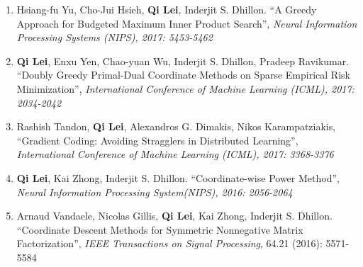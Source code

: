 \documentclass[margin, 10pt]{res} %
\begin{document}
\begin{resume}
\begin{enumerate}
\item{Hsiang-fu Yu, Cho-Jui Hsieh, \textbf{Qi Lei}, Inderjit S. Dhillon. 
      ``A Greedy Approach for Budgeted Maximum 
      Inner Product Search'', \textit{Neural Information Processing Systems 
      (NIPS), 2017: 5453-5462}}
    \item{\textbf{Qi Lei}, Enxu Yen, Chao-yuan Wu, Inderjit S. Dhillon, Pradeep 
        Ravikumar. ``Doubly Greedy Primal-Dual Coordinate Methods on Sparse Empirical 
  Risk Minimization'', \textit{International Conference of Machine 
    Learning (ICML), 2017: 2034-2042}}
\item{Rashish Tandon, \textbf{Qi Lei}, 
    Alexandros G. Dimakis, Nikos Karampatziakis, ``Gradient Coding: Avoiding 
    Stragglers in Distributed Learning'', \textit{International Conference of 
  Machine Learning (ICML), 2017: 3368-3376}}
  \item {\textbf{Qi Lei},
      Kai Zhong, Inderjit S. Dhillon. ``Coordinate-wise Power Method'', 
  \textit{Neural Information Processing System(NIPS), 2016: 2056-2064}}		

	\item {Arnaud Vandaele, Nicolas Gillis, \textbf{Qi Lei},
      Kai Zhong, Inderjit S. Dhillon. ``Coordinate Descent Methods for
		Symmetric Nonnegative Matrix Factorization'', \textit{IEEE Transactions on 
Signal Processing}, 64.21 (2016): 5571-5584}	
\end{enumerate}


\end{resume}
\end{document}
